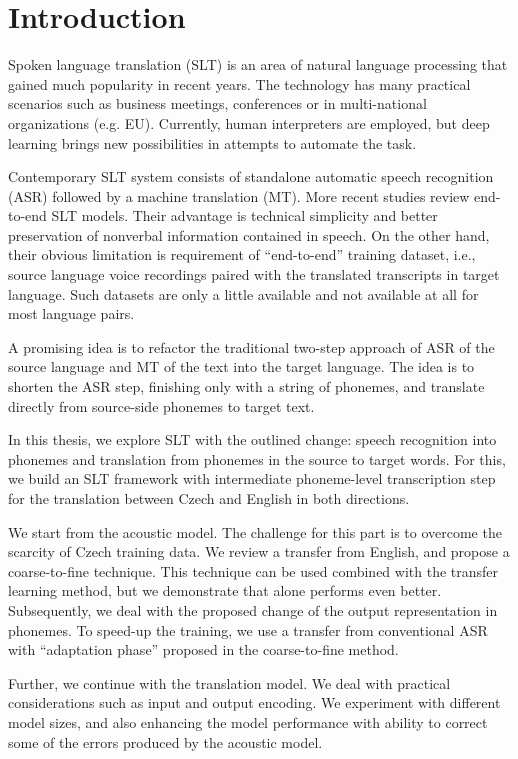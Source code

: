 \chapter*{Introduction}

Spoken language translation (SLT) is an area of natural language processing that gained much popularity in recent years. The technology has many practical scenarios such as business meetings, conferences or in multi-national organizations (e.g. EU). Currently, human interpreters are employed, but deep learning brings new possibilities in attempts to automate the task.

Contemporary SLT system consists of standalone automatic speech recognition (ASR) followed by a machine translation (MT). More recent studies review end-to-end SLT models. Their advantage is technical simplicity and better preservation of nonverbal information contained in speech. On the other hand, their obvious limitation is requirement of ``end-to-end'' training dataset, i.e., source language voice recordings paired with the translated transcripts in target language. Such datasets are only a little available and not available at all for most language pairs.

A promising idea is to refactor the traditional two-step approach of ASR of the source language and MT of the text into the target language. The idea is to shorten the ASR step, finishing only with a string of phonemes, and translate directly from source-side phonemes to target text.

In this thesis, we explore SLT with the outlined change: speech recognition into phonemes and translation from phonemes in the source to target words. For this, we build an SLT framework with intermediate phoneme-level transcription step for the translation between Czech and English in both directions. 

We start from the acoustic model. The challenge for this part is to overcome the scarcity of Czech training data. We review a transfer from English, and propose a coarse-to-fine technique. This technique can be used combined with the transfer learning method, but we demonstrate that alone performs even better. Subsequently, we deal with the proposed change of the output representation in phonemes. To speed-up the training, we use a transfer from conventional ASR with ``adaptation phase'' proposed in the coarse-to-fine method.

Further, we continue with the translation model. We deal with practical considerations such as input and output encoding. We experiment with different model sizes, and also enhancing the model performance with ability to correct some of the errors produced by the acoustic model.

